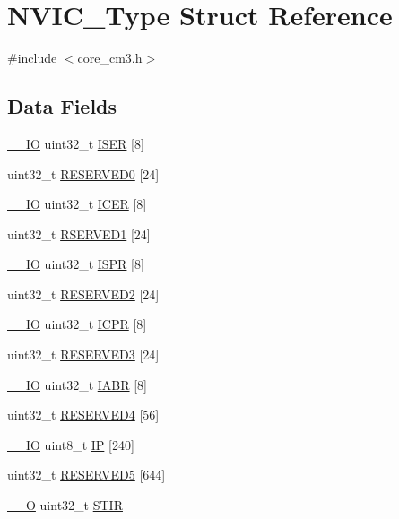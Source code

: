\hypertarget{structNVIC__Type}{}\section{N\+V\+I\+C\+\_\+\+Type Struct Reference}
\label{structNVIC__Type}


{\ttfamily \#include $<$core\+\_\+cm3.\+h$>$}

\subsection*{Data Fields}
\begin{DoxyCompactItemize}
\item 
\hyperlink{LPC17xx_8h_aec43007d9998a0a0e01faede4133d6be}{\+\_\+\+\_\+\+IO} uint32\+\_\+t \hyperlink{structNVIC__Type_af90c80b7c2b48e248780b3781e0df80f}{I\+S\+ER} \mbox{[}8\mbox{]}
\item 
uint32\+\_\+t \hyperlink{structNVIC__Type_a2de17698945ea49abd58a2d45bdc9c80}{R\+E\+S\+E\+R\+V\+E\+D0} \mbox{[}24\mbox{]}
\item 
\hyperlink{LPC17xx_8h_aec43007d9998a0a0e01faede4133d6be}{\+\_\+\+\_\+\+IO} uint32\+\_\+t \hyperlink{structNVIC__Type_a1965a2e68b61d2e2009621f6949211a5}{I\+C\+ER} \mbox{[}8\mbox{]}
\item 
uint32\+\_\+t \hyperlink{structNVIC__Type_a6d1daf7ab6f2ba83f57ff67ae6f571fe}{R\+S\+E\+R\+V\+E\+D1} \mbox{[}24\mbox{]}
\item 
\hyperlink{LPC17xx_8h_aec43007d9998a0a0e01faede4133d6be}{\+\_\+\+\_\+\+IO} uint32\+\_\+t \hyperlink{structNVIC__Type_acf8e38fc2e97316242ddeb7ea959ab90}{I\+S\+PR} \mbox{[}8\mbox{]}
\item 
uint32\+\_\+t \hyperlink{structNVIC__Type_a0953af43af8ec7fd5869a1d826ce5b72}{R\+E\+S\+E\+R\+V\+E\+D2} \mbox{[}24\mbox{]}
\item 
\hyperlink{LPC17xx_8h_aec43007d9998a0a0e01faede4133d6be}{\+\_\+\+\_\+\+IO} uint32\+\_\+t \hyperlink{structNVIC__Type_a46241be64208436d35c9a4f8552575c5}{I\+C\+PR} \mbox{[}8\mbox{]}
\item 
uint32\+\_\+t \hyperlink{structNVIC__Type_a9dd330835dbf21471e7b5be8692d77ab}{R\+E\+S\+E\+R\+V\+E\+D3} \mbox{[}24\mbox{]}
\item 
\hyperlink{LPC17xx_8h_aec43007d9998a0a0e01faede4133d6be}{\+\_\+\+\_\+\+IO} uint32\+\_\+t \hyperlink{structNVIC__Type_a33e917b381e08dabe4aa5eb2881a7c11}{I\+A\+BR} \mbox{[}8\mbox{]}
\item 
uint32\+\_\+t \hyperlink{structNVIC__Type_a5c0e5d507ac3c1bd5cdaaf9bbd177790}{R\+E\+S\+E\+R\+V\+E\+D4} \mbox{[}56\mbox{]}
\item 
\hyperlink{LPC17xx_8h_aec43007d9998a0a0e01faede4133d6be}{\+\_\+\+\_\+\+IO} uint8\+\_\+t \hyperlink{structNVIC__Type_a6524789fedb94623822c3e0a47f3d06c}{IP} \mbox{[}240\mbox{]}
\item 
uint32\+\_\+t \hyperlink{structNVIC__Type_a4f753b4f824270175af045ac99bc12e8}{R\+E\+S\+E\+R\+V\+E\+D5} \mbox{[}644\mbox{]}
\item 
\hyperlink{LPC17xx_8h_a7e25d9380f9ef903923964322e71f2f6}{\+\_\+\+\_\+O} uint32\+\_\+t \hyperlink{structNVIC__Type_a0b0d7f3131da89c659a2580249432749}{S\+T\+IR}
\end{DoxyCompactItemize}


